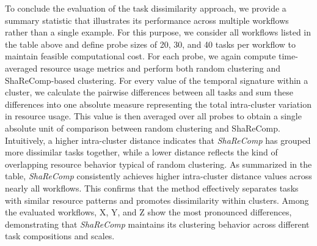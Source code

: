 To conclude the evaluation of the task dissimilarity approach, we provide a summary statistic that illustrates its performance across multiple workflows rather than a single example. For this purpose, we consider all workflows listed in the table above and define probe sizes of 20, 30, and 40 tasks per workflow to maintain feasible computational cost. For each probe, we again compute time-averaged resource usage metrics and perform both random clustering and ShaReComp-based clustering.
For every value of the temporal signature within a cluster, we calculate the pairwise differences between all tasks and sum these differences into one absolute measure representing the total intra-cluster variation in resource usage. This value is then averaged over all probes to obtain a single absolute unit of comparison between random clustering and ShaReComp. Intuitively, a higher intra-cluster distance indicates that \textit{ShaReComp} has grouped more dissimilar tasks together, while a lower distance reflects the kind of overlapping resource behavior typical of random clustering.
As summarized in the table, \textit{ShaReComp} consistently achieves higher intra-cluster distance values across nearly all workflows. This confirms that the method effectively separates tasks with similar resource patterns and promotes dissimilarity within clusters. Among the evaluated workflows, X, Y, and Z show the most pronounced differences, demonstrating that \textit{ShaReComp} maintains its clustering behavior across different task compositions and scales.

